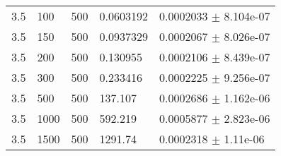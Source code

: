 \begin{longtable}{lllll}
 3.5 &   100 &   500 & 0.0603192 & 0.0002033 $\pm$ 8.104e-07 \\
 3.5 &   150 &   500 & 0.0937329 & 0.0002067 $\pm$ 8.026e-07 \\
 3.5 &   200 &   500 & 0.130955 & 0.0002106 $\pm$ 8.439e-07 \\
 3.5 &   300 &   500 & 0.233416 & 0.0002225 $\pm$ 9.256e-07 \\
 3.5 &   500 &   500 &  137.107 & 0.0002686 $\pm$ 1.162e-06 \\
 3.5 &  1000 &   500 &  592.219 & 0.0005877 $\pm$ 2.823e-06 \\
 3.5 &  1500 &   500 &  1291.74 & 0.0002318 $\pm$ 1.11e-06 \\

\end{longtable}
